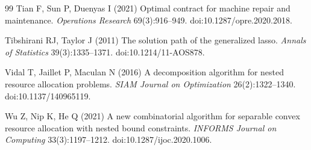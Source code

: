 \begin{thebibliography}{99}
Tian F, Sun P, Duenyas I (2021) Optimal contract for machine repair and maintenance. \emph{Operations Research} 69(3):916--949. doi:10.1287/opre.2020.2018.

Tibshirani RJ, Taylor J (2011) The solution path of the generalized lasso. \emph{Annals of Statistics} 39(3):1335--1371. doi:10.1214/11-AOS878.

Vidal T, Jaillet P, Maculan N (2016) A decomposition algorithm for nested resource allocation problems. \emph{SIAM Journal on Optimization} 26(2):1322--1340. doi:10.1137/140965119.

Wu Z, Nip K, He Q (2021) A new combinatorial algorithm for separable convex resource allocation with nested bound constraints. \emph{INFORMS Journal on Computing} 33(3):1197--1212. doi:10.1287/ijoc.2020.1006.
\end{thebibliography}
